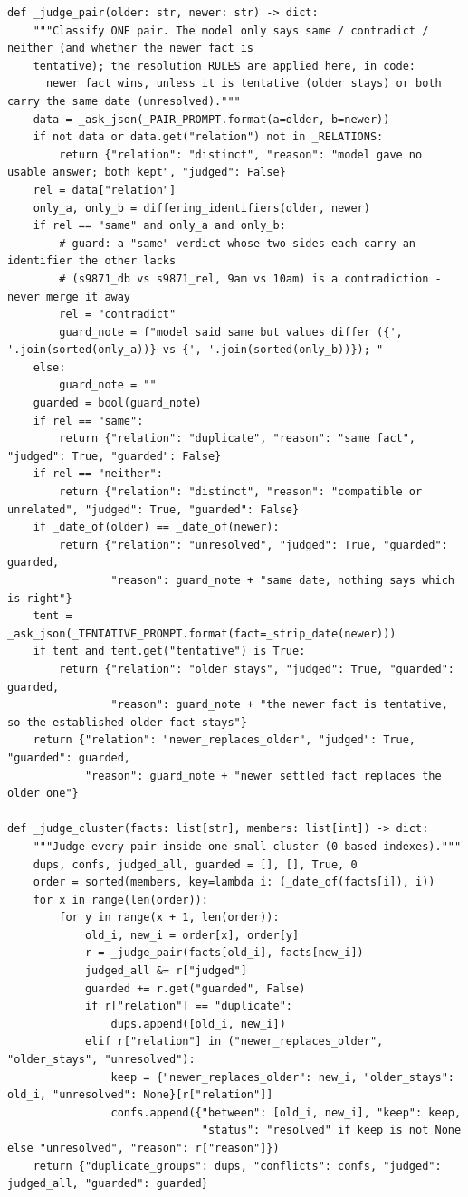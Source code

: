 \documentclass[11pt]{article}
\begin{document}
\endgroup
\begingroup\lstset{basicstyle=\ttfamily\scriptsize}
\begin{lstlisting}
def _judge_pair(older: str, newer: str) -> dict:
    """Classify ONE pair. The model only says same / contradict / neither (and whether the newer fact is
    tentative); the resolution RULES are applied here, in code:
      newer fact wins, unless it is tentative (older stays) or both carry the same date (unresolved)."""
    data = _ask_json(_PAIR_PROMPT.format(a=older, b=newer))
    if not data or data.get("relation") not in _RELATIONS:
        return {"relation": "distinct", "reason": "model gave no usable answer; both kept", "judged": False}
    rel = data["relation"]
    only_a, only_b = differing_identifiers(older, newer)
    if rel == "same" and only_a and only_b:
        # guard: a "same" verdict whose two sides each carry an identifier the other lacks
        # (s9871_db vs s9871_rel, 9am vs 10am) is a contradiction - never merge it away
        rel = "contradict"
        guard_note = f"model said same but values differ ({', '.join(sorted(only_a))} vs {', '.join(sorted(only_b))}); "
    else:
        guard_note = ""
    guarded = bool(guard_note)
    if rel == "same":
        return {"relation": "duplicate", "reason": "same fact", "judged": True, "guarded": False}
    if rel == "neither":
        return {"relation": "distinct", "reason": "compatible or unrelated", "judged": True, "guarded": False}
    if _date_of(older) == _date_of(newer):
        return {"relation": "unresolved", "judged": True, "guarded": guarded,
                "reason": guard_note + "same date, nothing says which is right"}
    tent = _ask_json(_TENTATIVE_PROMPT.format(fact=_strip_date(newer)))
    if tent and tent.get("tentative") is True:
        return {"relation": "older_stays", "judged": True, "guarded": guarded,
                "reason": guard_note + "the newer fact is tentative, so the established older fact stays"}
    return {"relation": "newer_replaces_older", "judged": True, "guarded": guarded,
            "reason": guard_note + "newer settled fact replaces the older one"}

def _judge_cluster(facts: list[str], members: list[int]) -> dict:
    """Judge every pair inside one small cluster (0-based indexes)."""
    dups, confs, judged_all, guarded = [], [], True, 0
    order = sorted(members, key=lambda i: (_date_of(facts[i]), i))
    for x in range(len(order)):
        for y in range(x + 1, len(order)):
            old_i, new_i = order[x], order[y]
            r = _judge_pair(facts[old_i], facts[new_i])
            judged_all &= r["judged"]
            guarded += r.get("guarded", False)
            if r["relation"] == "duplicate":
                dups.append([old_i, new_i])
            elif r["relation"] in ("newer_replaces_older", "older_stays", "unresolved"):
                keep = {"newer_replaces_older": new_i, "older_stays": old_i, "unresolved": None}[r["relation"]]
                confs.append({"between": [old_i, new_i], "keep": keep,
                              "status": "resolved" if keep is not None else "unresolved", "reason": r["reason"]})
    return {"duplicate_groups": dups, "conflicts": confs, "judged": judged_all, "guarded": guarded}
\end{lstlisting}
\end{document}
